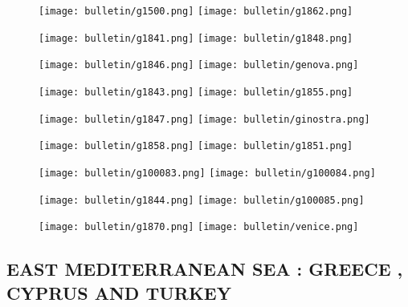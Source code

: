 \documentclass[a4paper]{article}
\renewcommand{\\}{\ {\large\textperiodcentered}\ }
\renewcommand{\\}{\ {\large\textperiodcentered}\ }
\begin{document}
\begin{figure}[h]
\centerline{
\texttt{[image: bulletin/g1500.png]}
\texttt{[image: bulletin/g1862.png]}
}
\end{figure}

\begin{figure}[h]
\centerline{
\texttt{[image: bulletin/g1841.png]}
\texttt{[image: bulletin/g1848.png]}
}
\end{figure}

\begin{figure}[h]
\centerline{
\texttt{[image: bulletin/g1846.png]}
\texttt{[image: bulletin/genova.png]}
}
\end{figure}
\begin{figure}[h]
\centerline{
\texttt{[image: bulletin/g1843.png]}
\texttt{[image: bulletin/g1855.png]}
}
\end{figure}

\begin{figure}[h]
\centerline{
\texttt{[image: bulletin/g1847.png]}
\texttt{[image: bulletin/ginostra.png]}
}
\end{figure}
\begin{figure}[h]
\centerline{
\texttt{[image: bulletin/g1858.png]}
\texttt{[image: bulletin/g1851.png]}
}
\end{figure}

\begin{figure}[h]
\centerline{
\texttt{[image: bulletin/g100083.png]}
\texttt{[image: bulletin/g100084.png]}
}
\end{figure}

\begin{figure}[h]
\centerline{
\texttt{[image: bulletin/g1844.png]}
\texttt{[image: bulletin/g100085.png]}
}
\end{figure}

\begin{figure}[h]
\end{figure}

\begin{figure}[h]
\centerline{
\texttt{[image: bulletin/g1870.png]}
\texttt{[image: bulletin/venice.png]}
}
\end{figure}

\clearpage

\subsection*{EAST MEDITERRANEAN SEA : GREECE , CYPRUS AND TURKEY}
\end{document}

